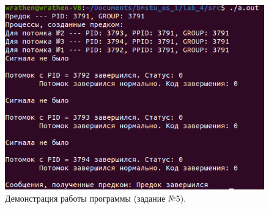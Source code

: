 \documentclass[12pt]{report}
\begin{document}
	\begin{lstlisting}[label=code:signal, caption=signal(), language=C]
		
	\end{lstlisting}

	\begin{figure}[H]
		
		\centering
		
		\includegraphics[width=\linewidth]{img/task_05.png}
		\caption{Демонстрация работы программы (задание №5).}
		
		\label{fig:task_05}
		
	\end{figure}
\end{document}
